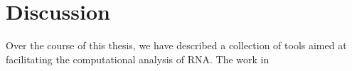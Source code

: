 
\chapter{Discussion}
\label{ch:disc}


Over the course of this thesis, we have described a collection of tools aimed
at facilitating the computational analysis of RNA. The work in 
